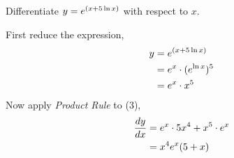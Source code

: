 

\question[3] Differentiate $y=e^{(x+5\ln x)}$ with respect to $x$.

\watchout

\begin{solution}[\mcq]
  First reduce the expression,
  \begin{align}
    y&=e^{(x+5\ln x)} \\
     &=e^x\cdot (e^{\ln x})^5 \\
     &=e^x\cdot x^5
  \end{align}
  Now apply \textit{Product Rule} to (3),
  \begin{align}
    \dfrac{dy}{dx}&=e^x\cdot 5 x^4 + x^5\cdot e^x \\
                  &=x^4 e^x(5 + x)
  \end{align}

\end{solution}
